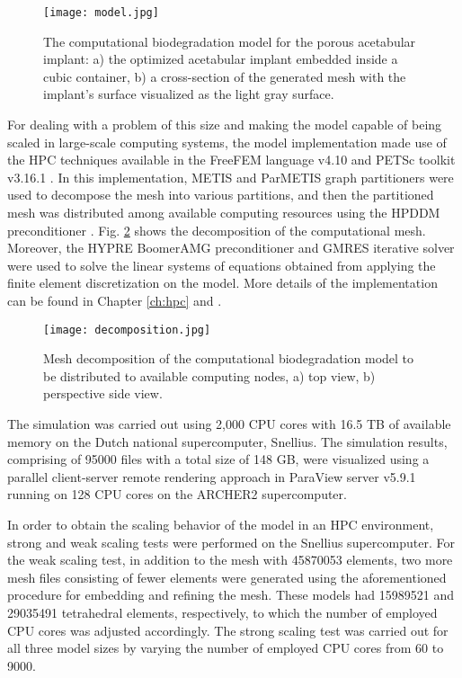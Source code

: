 \begin{figure}[h]
\centering
\medskip
\texttt{[image: model.jpg]}
\caption[Computational biodegradation model for the porous acetabular implant]{The computational biodegradation model for the porous acetabular implant: a) the optimized acetabular implant embedded inside a cubic container, b) a cross-section of the generated mesh with the implant's surface visualized as the light gray surface.} \label{fig:cup_model}
\end{figure}

For dealing with a problem of this size and making the model capable of being scaled in large-scale computing systems, the model implementation made use of the \gls{HPC} techniques available in the FreeFEM language v4.10 and \gls{PETSc} toolkit v3.16.1 \cite{petsc}. In this implementation, METIS and ParMETIS graph partitioners \cite{METIS1998} were used to decompose the mesh into various partitions, and then the partitioned mesh was distributed among available computing resources using the \gls{HPDDM} preconditioner \cite{Jolivet2013}. Fig. \ref{fig:cup_decomposition} shows the decomposition of the computational mesh. Moreover, the HYPRE BoomerAMG \cite{Falgout2002} preconditioner and \gls{GMRES} iterative solver \cite{Saad1986} were used to solve the linear systems of equations obtained from applying the finite element discretization on the model. More details of the implementation can be found in Chapter \ref{ch:hpc} and \cite{Barzegari2022}.

\begin{figure}[h]
\centering
\medskip
\texttt{[image: decomposition.jpg]}
\caption[Mesh decomposition of the acetabular implant model]{Mesh decomposition of the computational biodegradation model to be distributed to available computing nodes, a) top view, b) perspective side view. } \label{fig:cup_decomposition}
\end{figure}

The simulation was carried out using 2,000 \gls{CPU} cores with 16.5 TB of available memory on the Dutch national supercomputer, Snellius. The simulation results, comprising of \num{95000} files with a total size of 148 GB, were visualized using a parallel client-server remote rendering approach in ParaView server v5.9.1 running on 128 \gls{CPU} cores on the ARCHER2 supercomputer.

In order to obtain the scaling behavior of the model in an \gls{HPC} environment, strong and weak scaling tests were performed on the Snellius supercomputer. For the weak scaling test, in addition to the mesh with \num{45870053} elements, two more mesh files consisting of fewer elements were generated using the aforementioned procedure for embedding and refining the mesh. These models had \num{15989521} and \num{29035491} tetrahedral elements, respectively, to which the number of employed \gls{CPU} cores was adjusted accordingly. The strong scaling test was carried out for all three model sizes by varying the number of employed \gls{CPU} cores from 60 to \num{9000}.


